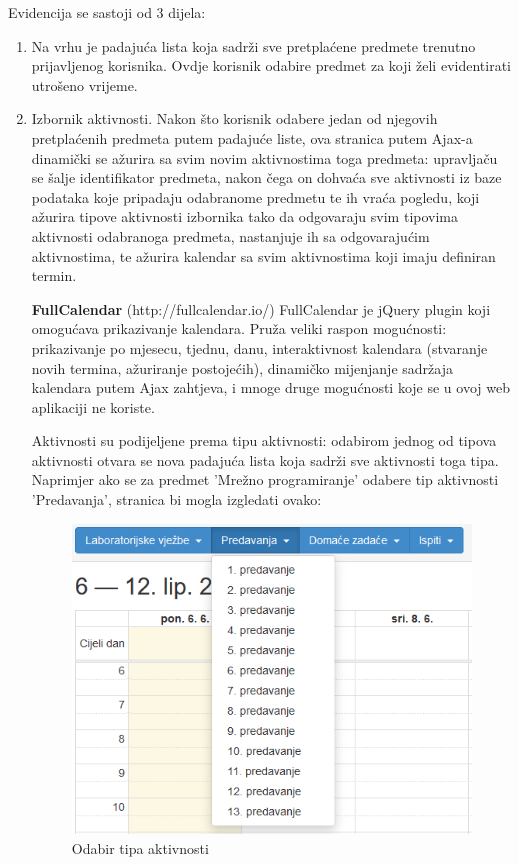 \documentclass[times, utf8, zavrsni]{fer}
\begin{document}
Evidencija se sastoji od 3 dijela:

\begin{enumerate}
\item Na vrhu je padajuća lista koja sadrži sve pretplaćene predmete trenutno prijavljenog korisnika. Ovdje korisnik odabire predmet za koji želi evidentirati utrošeno vrijeme.

\item Izbornik aktivnosti. Nakon što korisnik odabere jedan od njegovih pretplaćenih predmeta putem padajuće liste, ova stranica putem Ajax-a dinamički se ažurira sa svim novim aktivnostima toga predmeta: upravljaču se šalje identifikator predmeta, nakon čega on dohvaća sve aktivnosti iz baze podataka koje pripadaju odabranome predmetu te ih vraća pogledu, koji ažurira tipove aktivnosti izbornika tako da odgovaraju svim tipovima aktivnosti odabranoga predmeta, nastanjuje ih sa odgovarajućim aktivnostima, te ažurira kalendar sa svim aktivnostima koji imaju definiran termin.

\textbf{FullCalendar} (http://fullcalendar.io/)
FullCalendar je jQuery plugin koji omogućava prikazivanje kalendara. Pruža veliki raspon mogućnosti: prikazivanje po mjesecu, tjednu, danu, interaktivnost kalendara (stvaranje novih termina, ažuriranje postojećih), dinamičko mijenjanje sadržaja kalendara putem Ajax zahtjeva, i mnoge druge mogućnosti koje se u ovoj web aplikaciji ne koriste.

\lstset{style=js}


Aktivnosti su podijeljene prema tipu aktivnosti: odabirom jednog od tipova aktivnosti otvara se nova padajuća lista koja sadrži sve aktivnosti toga tipa. Naprimjer ako se za predmet 'Mrežno programiranje' odabere tip aktivnosti 'Predavanja', stranica bi mogla izgledati ovako:

\begin{figure}[H]
\centering
\includegraphics[scale=0.8]{img/selekcija.png}
\caption{Odabir tipa aktivnosti}
\label{fig:selekcija}
\end{figure}


\end{enumerate}
\end{document}
